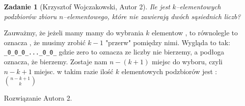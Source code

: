 \documentclass{mwart}
\newtheorem{zad}{Zadanie}[section]
\begin{document}
\begin{zad}[Krzysztof Wojczakowski, Autor 2]
    Ile jest $k$--elementowych podzbiorów zbioru $n$--elementowego, które nie
    zawierają dwóch sąsiednich liczb?
\end{zad}
\begin{mdframed}
    Zauważmy, że jeżeli mamy mamy do wybrania $k$ elementow , to równolegle to oznacza , że
    musimy zrobić $k-1$ "przerw" pomiędzy nimi. Wygląda to tak:
    \verb|_0_0_0_..._0_0_|
    gdzie zero to oznacza ze liczby nie bierzemy, a podłoga oznacza, że bierzemy.
    Zostaje nam $n-(k+1)$ miejsc do wyboru, czyli $n-k+1$ miejsc.
    w takim razie ilość $k$ elementowych podzbiorów jest :
    \( \binom{n-k+1}{k} \)

\end{mdframed}
\begin{mdframed}
    Rozwiązanie Autora 2.
\end{mdframed}
\end{document}
